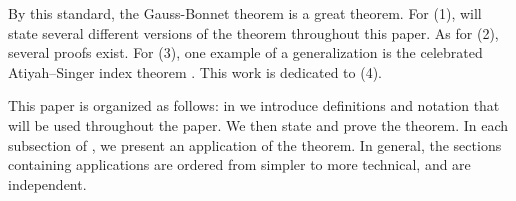 By this standard, the Gauss-Bonnet theorem is a great theorem.
For (1), will state several different versions of the theorem throughout this paper.
As for (2), several proofs exist.
For (3), one example of a generalization is the celebrated Atiyah–Singer index 
theorem \cite{atiyah_index_1963}.
This work is dedicated to (4).

This paper is organized as follows:
in  we introduce definitions and notation that will be used
throughout the paper. We then state and prove the theorem.
In each subsection of , we present an application of the theorem.
In general, the sections containing applications are ordered from simpler to more technical,
and are independent.


